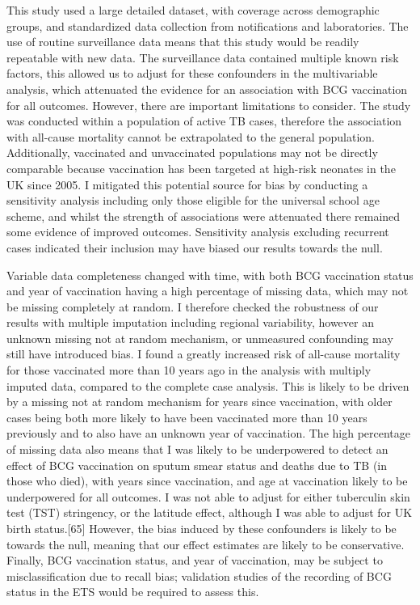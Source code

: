 \documentclass[11pt,twoside]{bristolthesis}
\begin{document}
  This study used a large detailed dataset, with coverage across demographic groups, and standardized data collection from notifications and laboratories. The use of routine surveillance data means that this study would be readily repeatable with new data. The surveillance data contained multiple known risk factors, this allowed us to adjust for these confounders in the multivariable analysis, which attenuated the evidence for an association with BCG vaccination for all outcomes. However, there are important limitations to consider. The study was conducted within a population of active TB cases, therefore the association with all-cause mortality cannot be extrapolated to the general population. Additionally, vaccinated and unvaccinated populations may not be directly comparable because vaccination has been targeted at high-risk neonates in the UK since 2005. I mitigated this potential source for bias by conducting a sensitivity analysis including only those eligible for the universal school age scheme, and whilst the strength of associations were attenuated there remained some evidence of improved outcomes. Sensitivity analysis excluding recurrent cases indicated their inclusion may have biased our results towards the null.
  
  Variable data completeness changed with time, with both BCG vaccination status and year of vaccination having a high percentage of missing data, which may not be missing completely at random. I therefore checked the robustness of our results with multiple imputation including regional variability, however an unknown missing not at random mechanism, or unmeasured confounding may still have introduced bias. I found a greatly increased risk of all-cause mortality for those vaccinated more than 10 years ago in the analysis with multiply imputed data, compared to the complete case analysis. This is likely to be driven by a missing not at random mechanism for years since vaccination, with older cases being both more likely to have been vaccinated more than 10 years previously and to also have an unknown year of vaccination. The high percentage of missing data also means that I was likely to be underpowered to detect an effect of BCG vaccination on sputum smear status and deaths due to TB (in those who died), with years since vaccination, and age at vaccination likely to be underpowered for all outcomes. I was not able to adjust for either tuberculin skin test (TST) stringency, or the latitude effect, although I was able to adjust for UK birth status.{[}65{]} However, the bias induced by these confounders is likely to be towards the null, meaning that our effect estimates are likely to be conservative. Finally, BCG vaccination status, and year of vaccination, may be subject to misclassification due to recall bias; validation studies of the recording of BCG status in the ETS would be required to assess this.
  
\end{document}
